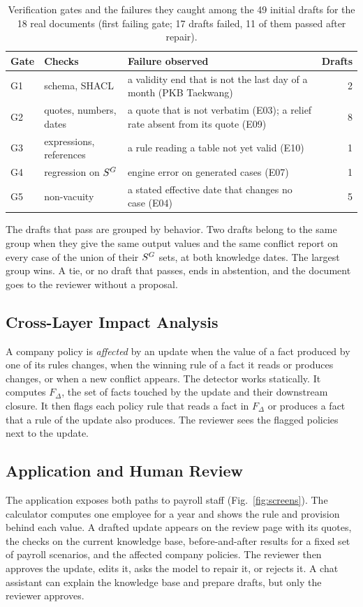 \begin{table}[!t]
\caption{Verification gates and the failures they caught among the 49 initial drafts for the 18 real documents (first failing gate; 17 drafts failed, 11 of them passed after repair).}
\label{tab:gates}
\centering\footnotesize
\setlength{\tabcolsep}{3pt}
\begin{tabularx}{\columnwidth}{@{}lLLr@{}}
\toprule
Gate & Checks & Failure observed & Drafts \\
\midrule
G1 & schema, SHACL & a validity end that is not the last day of a month (PKB Taekwang) & 2 \\
G2 & quotes, numbers, dates & a quote that is not verbatim (E03); a relief rate absent from its quote (E09) & 8 \\
G3 & expressions, references & a rule reading a table not yet valid (E10) & 1 \\
G4 & regression on $S^{G}$ & engine error on generated cases (E07) & 1 \\
G5 & non-vacuity & a stated effective date that changes no case (E04) & 5 \\
\bottomrule
\end{tabularx}
\end{table}

The drafts that pass are grouped by behavior. Two drafts belong to the same group when they give the same output values and the same conflict report on every case of the union of their $S^{G}$ sets, at both knowledge dates. The largest group wins. A tie, or no draft that passes, ends in abstention, and the document goes to the reviewer without a proposal.

\subsection{Cross-Layer Impact Analysis}
A company policy is \emph{affected} by an update when the value of a fact produced by one of its rules changes, when the winning rule of a fact it reads or produces changes, or when a new conflict appears. The detector works statically. It computes $F_\Delta$, the set of facts touched by the update and their downstream closure. It then flags each policy rule that reads a fact in $F_\Delta$ or produces a fact that a rule of the update also produces. The reviewer sees the flagged policies next to the update.

\subsection{Application and Human Review}
The application exposes both paths to payroll staff (Fig.~\ref{fig:screens}). The calculator computes one employee for a year and shows the rule and provision behind each value. A drafted update appears on the review page with its quotes, the checks on the current knowledge base, before-and-after results for a fixed set of payroll scenarios, and the affected company policies. The reviewer then approves the update, edits it, asks the model to repair it, or rejects it. A chat assistant can explain the knowledge base and prepare drafts, but only the reviewer approves.

